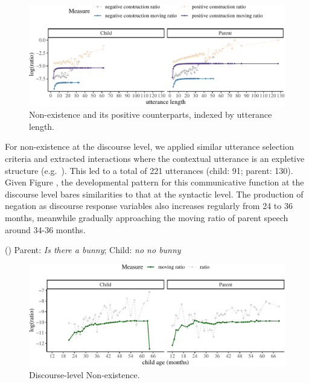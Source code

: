 \documentclass[
  english,
  man,floatsintext]{apa6}
\begin{document}
\begin{figure}[H]

{\centering \includegraphics{neg_construction_article_files/figure-latex/existenceul-1} 

}

\caption{Non-existence and its positive counterparts, indexed by utterance length.}\label{fig:existenceul}
\end{figure}

For non-existence at the discourse level, we applied similar utterance selection criteria and extracted interactions where the contextual utterance is an expletive structure (e.g.~). This led to a total of 221 utterances (child: 91; parent: 130).
Given Figure , the developmental pattern for this communicative function at the discourse level bares similarities to that at the syntactic level. The production of negation as discourse response variables also increases regularly from 24 to 36 months, meanwhile gradually approaching the moving ratio of parent speech around 34-36 months.

() Parent: \emph{Is there a bunny}; Child: \emph{no no bunny}

\begin{figure}[H]

{\centering \includegraphics{neg_construction_article_files/figure-latex/existencediscourse-1} 

}

\caption{Discourse-level Non-existence.}\label{fig:existencediscourse}
\end{figure}
\end{document}
